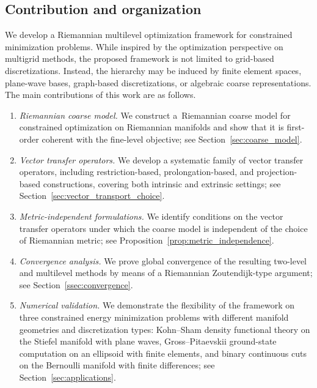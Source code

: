 \documentclass[11pt,reqno]{amsart}
\theoremstyle{plain}
\begin{document}
	\subsection{Contribution and organization}
	\label{ssec:contribution}
	
	We develop a Riemannian multilevel optimization framework for constrained minimization problems.  While inspired by the optimization perspective on multigrid methods, the proposed framework is not limited to grid-based discretizations. Instead, the hierarchy may be induced by finite element spaces, plane-wave bases, graph-based discretizations, or algebraic coarse representations. The main contributions of this work are as follows.
	
	\begin{enumerate}
		\item \textit{Riemannian coarse model.} 
		We construct a~Riemannian coarse model for constrained optimization on Riemannian manifolds and show that it is first-order coherent with the fine-level objective; see Section~\ref{sec:coarse_model}.
		\item \textit{Vector transfer operators.} We develop a systematic family of vector transfer operators, including restriction-based, prolongation-based, and projection-based constructions, covering both intrinsic and extrinsic settings; see Section~\ref{sec:vector_transport_choice}.
		\item \textit{Metric-independent formulations.} We identify conditions on the vector transfer operators under which the coarse model is independent of the choice of Riemannian metric; see Proposition~\ref{prop:metric_independence}.
		\item \textit{Convergence analysis.} We prove global convergence of the resulting two-level and multilevel methods by means of  a Riemannian Zoutendijk-type argument; see Section~\ref{ssec:convergence}.
		\item \textit{Numerical validation.} 
		We demonstrate the flexibility of the framework on three constrained energy minimization problems with different manifold geometries and discretization types: Kohn--Sham density functional theory on the Stiefel manifold with plane waves, Gross--Pitaevskii ground-state computation on an ellipsoid with finite elements, and binary continuous cuts on the Bernoulli manifold with finite differences; see Section~\ref{sec:applications}.
	\end{enumerate}
	
\end{document}
